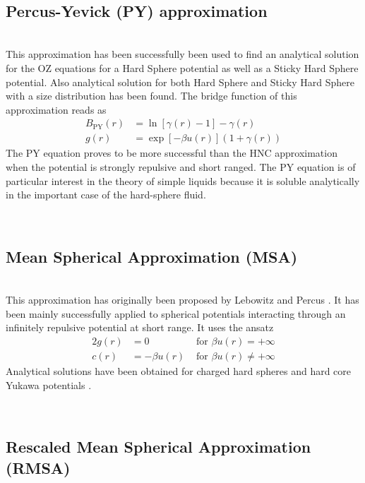 \vphantom{.}~\\
\subsection{Percus-Yevick (PY) approximation}
~\\

This approximation has been successfully been used to find an analytical solution for
the OZ equations for a Hard Sphere potential as well as a Sticky Hard Sphere potential.
Also analytical solution for both Hard Sphere \cite{Percus1958,Wertheim1963} and
Sticky Hard Sphere  \cite{Baxter1968} with a size distribution has been found.
The bridge function of this approximation reads as
\begin{align} \label{eq:ozPY}
B_\text{PY}(r) &=\ln\left[\gamma(r)-1\right]-\gamma(r) \\
g(r)&= \exp\left[ -\beta u(r)\right]\left(1 +\gamma(r)\right)
\end{align}
The PY equation proves to be more successful than the HNC
approximation when the potential is strongly repulsive and short
ranged. The PY equation is of particular interest in the theory of
simple liquids because it is soluble analytically in the important
case of the hard-sphere fluid.

\vphantom{.}~\\
\subsection{Mean Spherical Approximation (MSA)}
\label{sec:MSA}~\\

This approximation has originally been proposed by Lebowitz and Percus \cite{Lebowitz1966}.
It has been mainly successfully applied to spherical potentials interacting through an infinitely
repulsive potential at short range. It uses the ansatz
\begin{alignat}{2}
g(r) &=  0 &\mbox{ for } \beta u(r) = +\infty \\
c(r) &= -\beta u(r) &\mbox{ for } \beta u(r) \neq +\infty
\end{alignat}
Analytical solutions have been obtained for charged hard spheres and hard core Yukawa potentials \cite{Caccamo1996}.

\vphantom{.}~\\
\subsection{Rescaled Mean Spherical Approximation (RMSA)}
\label{sec:RMSA}~\\

